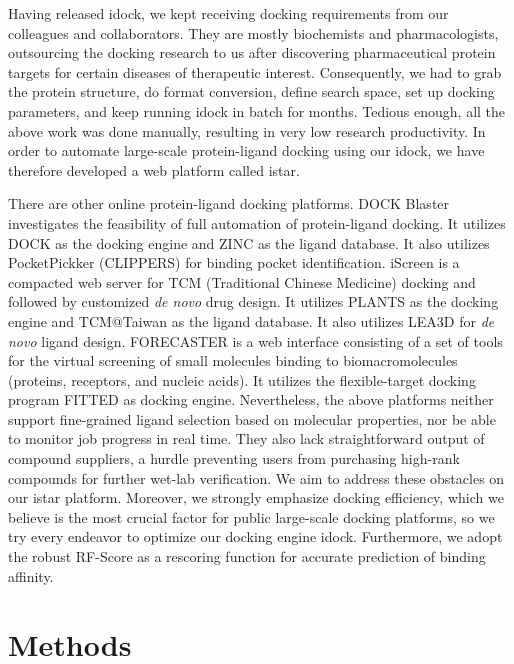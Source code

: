 \documentclass[10pt]{article}
\begin{document}
Having released idock, we kept receiving docking requirements from our colleagues and collaborators. They are mostly biochemists and pharmacologists, outsourcing the docking research to us after discovering pharmaceutical protein targets for certain diseases of therapeutic interest. Consequently, we had to grab the protein structure, do format conversion, define search space, set up docking parameters, and keep running idock in batch for months. Tedious enough, all the above work was done manually, resulting in very low research productivity. In order to automate large-scale protein-ligand docking using our idock, we have therefore developed a web platform called istar.

There are other online protein-ligand docking platforms. DOCK Blaster \cite{557} investigates the feasibility of full automation of protein-ligand docking. It utilizes DOCK \cite{1222} as the docking engine and ZINC \cite{532,1178} as the ligand database. It also utilizes PocketPickker (CLIPPERS) \cite{395} for binding pocket identification. iScreen \cite{899} is a compacted web server for TCM (Traditional Chinese Medicine) docking and followed by customized \textit{de novo} drug design. It utilizes PLANTS \cite{610,607,779} as the docking engine and TCM@Taiwan \cite{528} as the ligand database. It also utilizes LEA3D \cite{1223} for \textit{de novo} ligand design. FORECASTER \cite{1012} is a web interface consisting of a set of tools for the virtual screening of small molecules binding to biomacromolecules (proteins, receptors, and nucleic acids). It utilizes the flexible-target docking program FITTED \cite{602} as docking engine. Nevertheless, the above platforms neither support fine-grained ligand selection based on molecular properties, nor be able to monitor job progress in real time. They also lack straightforward output of compound suppliers, a hurdle preventing users from purchasing high-rank compounds for further wet-lab verification. We aim to address these obstacles on our istar platform. Moreover, we strongly emphasize docking efficiency, which we believe is the most crucial factor for public large-scale docking platforms, so we try every endeavor to optimize our docking engine idock. Furthermore, we adopt the robust RF-Score \cite{564} as a rescoring function for accurate prediction of binding affinity.

\section*{Methods}
\end{document}
